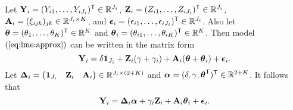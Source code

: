 Let $\V{y}_i = (Y_{i1},\ldots, Y_{iJ_i})\Tra\in \R^{J_i}$,
$\V{Z}_i = (Z_{i1},\ldots, Z_{iJ_i})\Tra\in\R^{J_i}$, 
$\V{A}_i = (\xi_{ijk})_{jk}\in\R^{J_i\times K}$,
and $\V{\epsilon}_i = (\epsilon_{i1},\ldots, \epsilon_{iJ_i})\Tra\in\R^{J_i}$.
Also let $\V{\theta} = (\theta_1,\ldots, \theta_K)\Tra\in\R^K$ and
$\V{\theta}_i = (\theta_{i1},\ldots,\theta_{iK})\Tra\in \R^K$.
Then model $(\ref{eq:lme:approx})$ can be written in the matrix form
$$
\V{y}_{i} =\delta \V{1}_{J_i} + \V{Z}_{i} (\gamma + \gamma_i) + \M{A}_{i} ( \V{\theta} +  \V{\theta}_{i}) + \V{\epsilon}_{i}.
$$
Let
$\M{\Delta}_i= \begin{pmatrix}\V{1}_{J_i} &\V{Z}_{i}& \M{A}_{i} \end{pmatrix}\in\R^{J_i\times (2+K)}$ and
$\V{\alpha} = (\delta,\gamma,\V{\theta}\Tra)\Tra\in\R^{2+K}$. It follows that
\begin{equation}
\label{eq:matrix}
\V{y}_{i} = \M{\Delta}_i \V{\alpha} +\gamma_i\V{Z}_{i} + \M{A}_{i} \V{\theta}_{i}  + \V{\epsilon}_{i}.
\end{equation}
